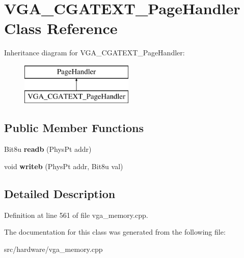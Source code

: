 \hypertarget{classVGA__CGATEXT__PageHandler}{\section{V\-G\-A\-\_\-\-C\-G\-A\-T\-E\-X\-T\-\_\-\-Page\-Handler Class Reference}
\label{classVGA__CGATEXT__PageHandler}
}
Inheritance diagram for V\-G\-A\-\_\-\-C\-G\-A\-T\-E\-X\-T\-\_\-\-Page\-Handler\-:\begin{figure}[H]
\begin{center}
\leavevmode
\includegraphics[height=2.000000cm]{classVGA__CGATEXT__PageHandler}
\end{center}
\end{figure}
\subsection*{Public Member Functions}
\begin{DoxyCompactItemize}
\item 
\hypertarget{classVGA__CGATEXT__PageHandler_a3ae8ae400461447fd27479afa922cc4f}{Bit8u {\bfseries readb} (Phys\-Pt addr)}\label{classVGA__CGATEXT__PageHandler_a3ae8ae400461447fd27479afa922cc4f}

\item 
\hypertarget{classVGA__CGATEXT__PageHandler_a48fb5b9350269a820af9fbaf3a7f30eb}{void {\bfseries writeb} (Phys\-Pt addr, Bit8u val)}\label{classVGA__CGATEXT__PageHandler_a48fb5b9350269a820af9fbaf3a7f30eb}

\end{DoxyCompactItemize}


\subsection{Detailed Description}


Definition at line 561 of file vga\-\_\-memory.\-cpp.



The documentation for this class was generated from the following file\-:\begin{DoxyCompactItemize}
\item 
src/hardware/vga\-\_\-memory.\-cpp\end{DoxyCompactItemize}
